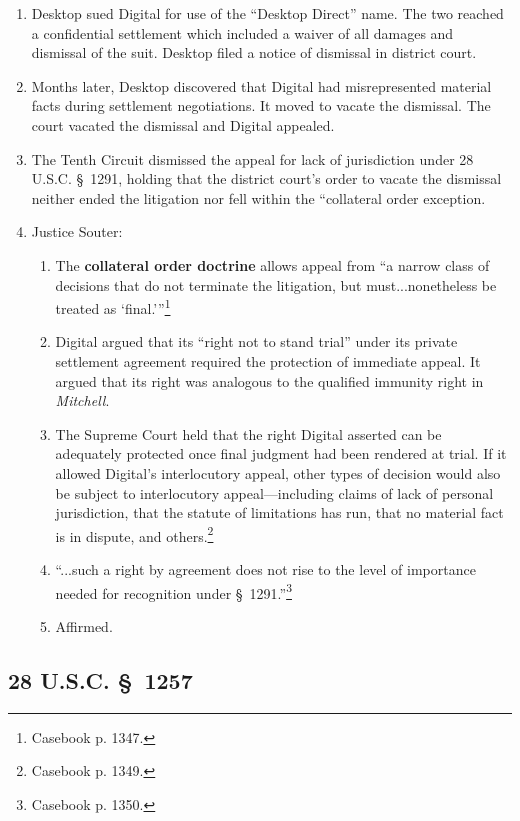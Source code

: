 \begin{enumerate}
    \item Desktop sued Digital for use of the ``Desktop Direct'' name. The two 
    reached a confidential settlement which included a waiver of all damages 
    and dismissal of the suit. Desktop filed a notice of dismissal in district 
    court.
    \item Months later, Desktop discovered that Digital had misrepresented 
    material facts during settlement negotiations. It moved to vacate the 
    dismissal. The court vacated the dismissal and Digital appealed.
    \item The Tenth Circuit dismissed the appeal for lack of jurisdiction 
    under 28 U.S.C. \S\ 1291, holding that the district court's order to 
    vacate the dismissal neither ended the litigation nor fell within the 
    ``collateral order exception.
    \item Justice Souter:
    \begin{enumerate}
        \item The \textbf{collateral order doctrine} allows appeal from ``a 
        narrow class of decisions that do not terminate the litigation, but 
        must...nonetheless be treated as `final.'''\footnote{Casebook p. 
        1347.}
        \item Digital argued that its ``right not to stand trial'' under its 
        private settlement agreement required the protection of immediate 
        appeal. It argued that its right was analogous to the qualified 
        immunity right in \emph{Mitchell}.
        \item The Supreme Court held that the right Digital asserted can be 
        adequately protected once final judgment had been rendered at trial. 
        If it allowed Digital's interlocutory appeal, other types of decision
        would also be subject to interlocutory appeal---including claims of 
        lack of personal jurisdiction, that the statute of limitations has 
        run, that no material fact is in dispute, and 
        others.\footnote{Casebook p. 1349.}
        \item ``...such a right by agreement does not rise to the level of 
        importance needed for recognition under \S\ 1291.''\footnote{Casebook 
        p. 1350.}
        \item Affirmed.
    \end{enumerate}
\end{enumerate}

\subsection{28 U.S.C. \S\ 1257}

